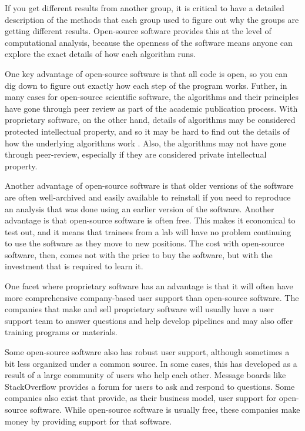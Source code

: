 \documentclass[]{tufte-book}
\begin{document}
If you get different results from another group, it is critical to have a
detailed description of the methods that each group used to figure out why
the groups are getting different results. Open-source software provides this
at the level of computational analysis, because the openness of the software
means anyone can explore the exact details of how each algorithm runs.

One key advantage of open-source software is that all code is open, so you can
dig down to figure out exactly how each step of the program works. Futher, in
many cases for open-source scientific software, the algorithms and their
principles have gone through peer review as part of the academic publication
process. With proprietary software, on the other hand, details of algorithms may
be considered protected intellectual property, and so it may be hard to find out
the details of how the underlying algorithms work \citep{nekrutenko2012next}. Also,
the algorithms may not have gone through peer-review, especially if they are
considered private intellectual property.

Another advantage of open-source software is that older versions of the software
are often well-archived and easily available to reinstall if you need to
reproduce an analysis that was done using an earlier version of the software.
Another advantage is that open-source software is often free. This makes it
economical to test out, and it means that trainees from a lab will have no
problem continuing to use the software as they move to new positions.
The cost with open-source software, then, comes not with the price to buy
the software, but with the investment that is required to learn it.

One facet where proprietary software has an advantage is that it will often have
more comprehensive company-based user support than open-source software. The
companies that make and sell proprietary software will usually have a user
support team to answer questions and help develop pipelines and may also offer
training programs or materials.

Some open-source software also has robust user support, although sometimes a bit
less organized under a common source. In some cases, this has developed as a
result of a large community of users who help each other. Message boards like
StackOverflow provides a forum for users to ask and respond to questions. Some
companies also exist that provide, as their business model, user support for
open-source software. While open-source software is usually free, these
companies make money by providing support for that software.
\end{document}
